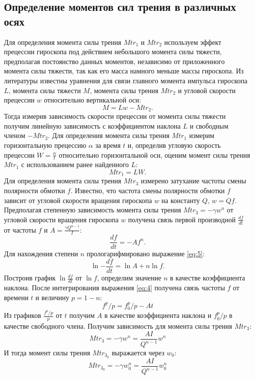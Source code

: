 \documentclass[12pt]{article}
\begin{document}
\subsection{Определение моментов сил трения в различных осях}
Для определения момента силы трения $Mtr_1$ и $Mtr_2$ используем эффект прецессии гироскопа под действием небольшого момента силы тяжести, 
предполагая постоянство данных моментов, независимо от приложенного момента силы тяжести, так как его масса намного меньше массы гироскопа.
Из литературы\cite{LabBook} известны уравнения для связи главного момента импульса гироскопа $L$, момента силы тяжести $M$, 
момента силы трения $Mtr_2$ и угловой скорости прецессии $w$ относительно вертикальной оси:
\begin{equation}\label{eq:3}
    M = Lw - Mtr_2.
\end{equation}
Тогда измерив зависимость скорости прецессии от момента силы тяжести получим линейную зависимость с коэффициентом наклона $L$ и свободным членом
$-Mtr_2$.
Для определения момента силы трения $Mtr_1$ измерим горизонтальную прецессию $\alpha$ за время $t$ и, определив угловую скорость прецессии 
$W = \frac{\alpha}{t}$ относительно горизонтальной оси, оценим момент силы трения $Mtr_1$ с использованием ранее найденного $L$:
\begin{equation}\label{eq:4}
    Mtr_1 = LW.
\end{equation}
Для определения момента силы трения $Mtr_3$ измерено затухание частоты смены полярности обмотки $f$. Известно, что частота смены полярности обмотки $f$
зависит от угловой скорости вращения гироскопа $w$ на константу $Q$, $w = Qf$. Предполагая степенную зависимость момента силы трения $Mtr_3 = -\gamma w^n$
от угловой скорости вращения гироскопа $w$ получена связь первой производной $\frac{df}{dt}$ от частоты $f$ и $A = \frac{\gamma Q^{n-1}}{I}$:
\begin{equation}\label{eq:5}
    \frac{df}{dt} = -Af^n.
\end{equation}
Для нахождения степени $n$ прологарифмировано выражение \ref{eq:5}:
\begin{equation}\label{eq:6}
    \ln{-\frac{df}{dt}} = \ln{A} + n\ln{f}.
\end{equation}
Построив график $\ln{\frac{df}{dt}}$ от $\ln{f}$, определим значение $n$ в качестве коэффициента наклона.
После интегрирования выражения \ref{eq:4} получена связь частоты $f$ от времени $t$ и величину $p = 1 - n$:
\begin{equation}\label{eq:7}
    f^p/p = f_0^p/p - At
\end{equation}
Из графиков $\frac{f^p/p}{p}$ от $t$ получим $A$ в качестве коэффициента наклона и $f_0^p/p$ в качестве свободного члена. Получим зависимость 
для момента силы трения $Mtr_3$:
\begin{equation}\label{eq:8}
    Mtr_3 = -\gamma w^n = \frac{AI}{Q^{n-1}} w^n
\end{equation}
И тогда момент силы трения $Mtr_{3_0}$ выражается через $w_0$:
\begin{equation}\label{eq:9}
    Mtr_{3_0} = -\gamma w_0^n = \frac{AI}{Q^{n-1}} w_0^n
\end{equation}
\end{document}
